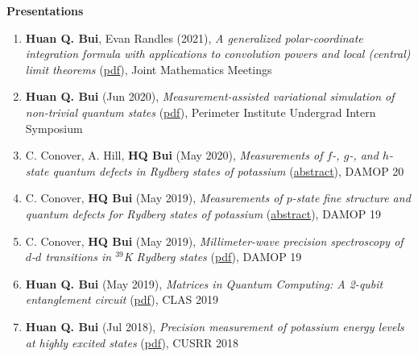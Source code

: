 \documentclass[10pt]{article}
\begin{document}
\noindent \large{\textbf{{Presentations}}}  \normalsize  \vspace{-5pt}
\begin{enumerate}
	\setlength\itemsep{-0pt}
	\item \textbf{Huan Q. Bui}, Evan Randles (2021), \textit{A generalized polar-coordinate integration formula with applications to convolution powers and local (central) limit theorems} (\href{https://jointmathematicsmeetings.org/amsmtgs/2247_abstracts/1163-42-1122.pdf}{{pdf}}), Joint Mathematics Meetings
	
	\item \textbf{Huan Q. Bui} (Jun 2020), \textit{Measurement-assisted variational simulation of non-trivial quantum states} (\href{https://huanqbui.com/LaTeX 20projects/HuanBui_Perimeter/Presentation/MBQC_as_Simulation.pdf}{{pdf}}), Perimeter Institute Undergrad Intern Symposium
	
	\item C. Conover, A. Hill, \textbf{HQ Bui} (May 2020), \textit{Measurements of $f$-, $g$-, and $h$-state quantum defects in Rydberg states of potassium} (\href{http://meetings.aps.org/Meeting/DAMOP20/Session/K01.17}{abstract}),  DAMOP 20
	
	\item C. Conover, \textbf{HQ Bui} (May 2019), \textit{Measurements of $p$-state fine structure and quantum defects for Rydberg states of potassium} (\href{https://ui.adsabs.harvard.edu/abs/2019APS..DMPL01169C/abstract}{{abstract}}), DAMOP 19
	
	\item C. Conover, \textbf{HQ Bui} (May 2019), \textit{Millimeter-wave precision spectroscopy of $d$-$d$ transitions in $^{\text{39}}$K Rydberg states} (\href{https://huanqbui.com/research/DAMOP19 20poster/DAMOP19.pdf}{{pdf}}), DAMOP 19
	
	\item \textbf{Huan Q. Bui} (May 2019), \textit{Matrices in Quantum Computing: A 2-qubit entanglement circuit} (\href{https://huanqbui.com/LaTeX 20projects/Matrix_Analysis/CLAS 202019/Quantum-Circuit.pdf}{{pdf}}), CLAS 2019
	
	\item \textbf{Huan Q. Bui} (Jul 2018), \textit{Precision measurement of potassium energy levels at highly excited states} (\href{https://huanqbui.com/research/CUSRR2018.pdf}{{pdf}}), CUSRR 2018
\end{enumerate}
\end{document}
